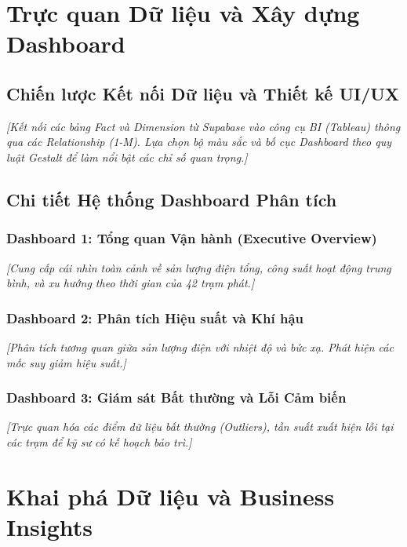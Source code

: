 \documentclass[12pt, a4paper]{report}
\begin{document}
\chapter{Trực quan Dữ liệu và Xây dựng Dashboard}
\label{chap:dashboard}

\section{Chiến lược Kết nối Dữ liệu và Thiết kế UI/UX}
\label{sec:dashboard_strategy}
\textit{[Kết nối các bảng Fact và Dimension từ Supabase vào công cụ BI (Tableau) thông qua các Relationship (1-M). Lựa chọn bộ màu sắc và bố cục Dashboard theo quy luật Gestalt để làm nổi bật các chỉ số quan trọng.]}

\section{Chi tiết Hệ thống Dashboard Phân tích}
\label{sec:dashboard_details}
\subsection{Dashboard 1: Tổng quan Vận hành (Executive Overview)}
\textit{[Cung cấp cái nhìn toàn cảnh về sản lượng điện tổng, công suất hoạt động trung bình, và xu hướng theo thời gian của 42 trạm phát.]}

\subsection{Dashboard 2: Phân tích Hiệu suất và Khí hậu}
\textit{[Phân tích tương quan giữa sản lượng điện với nhiệt độ và bức xạ. Phát hiện các mốc suy giảm hiệu suất.]}

\subsection{Dashboard 3: Giám sát Bất thường và Lỗi Cảm biến}
\textit{[Trực quan hóa các điểm dữ liệu bất thường (Outliers), tần suất xuất hiện lỗi tại các trạm để kỹ sư có kế hoạch bảo trì.]}


\chapter{Khai phá Dữ liệu và Business Insights}
\label{chap:insights}
\end{document}
